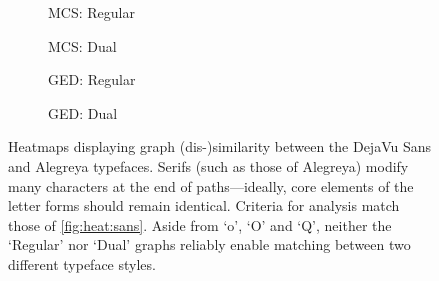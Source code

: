\documentclass{mpaper}
\begin{document}
\begin{figure}
	\centering
	\begin{subfigure}[b]{0.225\linewidth}
		
		\caption{MCS: Regular\label{fig:heat:vs:mcs-r}}
	\end{subfigure}
	\begin{subfigure}[b]{0.225\linewidth}
		
		\caption{MCS: Dual\label{fig:heat:vs:mcs-d}}
	\end{subfigure}
	\begin{subfigure}[b]{0.225\linewidth}
		
		\caption{GED: Regular\label{fig:heat:vs:ged-r}}
	\end{subfigure}
	\begin{subfigure}[b]{0.225\linewidth}
		
		\caption{GED: Dual\label{fig:heat:vs:ged-d}}
	\end{subfigure}
	
	\vspace{0.5em}
	\caption{
		Heatmaps displaying graph (dis-)similarity between the DejaVu Sans and Alegreya typefaces.
		Serifs (such as those of Alegreya) modify many characters at the end of paths---ideally, core elements of the letter forms should remain identical.
		Criteria for analysis match those of \cref{fig:heat:sans}.
		Aside from `o', `O' and `Q', neither the `Regular' nor `Dual' graphs reliably enable matching between two different typeface styles.
		\label{fig:heat:vs}
	}
\end{figure}


%

\end{document}
